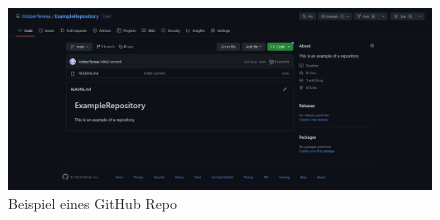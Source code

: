 \begin{figure}[h t]
  \centering
  \includegraphics[scale=0.38]{pics/exampleRepository.jpg}
  \caption{Beispiel eines GitHub Repo}
  \label{fig:impl:githubRepository}
\end{figure}
